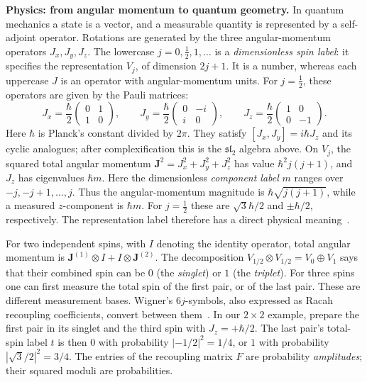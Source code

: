 \begin{physicsbox}
\textbf{Physics: from angular momentum to quantum geometry.}
In quantum mechanics a state is a vector, and a measurable quantity
is represented by a self-adjoint operator. Rotations are generated
by the three angular-momentum operators $J_x,J_y,J_z$.
The lowercase $j=0,\tfrac12,1,\ldots$ is a \emph{dimensionless
spin label}: it specifies the representation $V_j$, of dimension
$2j+1$. It is a number, whereas each uppercase $J$ is an operator
with angular-momentum units. For $j=\tfrac12$, these operators
are given by the Pauli matrices:
\[
 J_x=\frac{\hbar}{2}\begin{pmatrix}0&1\\1&0\end{pmatrix},\qquad
 J_y=\frac{\hbar}{2}\begin{pmatrix}0&-i\\i&0\end{pmatrix},\qquad
 J_z=\frac{\hbar}{2}\begin{pmatrix}1&0\\0&-1\end{pmatrix}.
\]
Here $\hbar$ is Planck's constant divided by $2\pi$.
They satisfy $[J_x,J_y]=i\hbar J_z$ and its cyclic analogues;
after complexification this is the $\mathfrak{sl}_2$ algebra above.
On $V_j$, the squared total angular momentum
$\mathbf J^2=J_x^2+J_y^2+J_z^2$ has value $\hbar^2j(j+1)$,
and $J_z$ has eigenvalues $\hbar m$. Here the dimensionless
\emph{component label} $m$ ranges over $-j,-j+1,\ldots,j$.
Thus the angular-momentum magnitude is $\hbar\sqrt{j(j+1)}$,
while a measured $z$-component is $\hbar m$. For $j=\tfrac12$
these are $\sqrt3\hbar/2$ and $\pm\hbar/2$, respectively.
The representation label therefore has a direct physical meaning~\cite[Section 4.2]{CappellaroSpin}.

For two independent spins, with $I$ denoting the identity operator,
total angular momentum is
$\mathbf J^{(1)}\otimes I+I\otimes\mathbf J^{(2)}$.
The decomposition $V_{1/2}\otimes V_{1/2}=V_0\oplus V_1$
says that their combined spin can be $0$ (the \emph{singlet})
or $1$ (the \emph{triplet}). For three spins one can first measure
the total spin of the first pair, or of the last pair. These are
different measurement bases. Wigner's $6j$-symbols, also expressed
as Racah recoupling coefficients, convert between them~\cite[Section 1]{AquilantiSixJ}.
In our $2\times2$ example, prepare the first pair in its singlet
and the third spin with $J_z=+\hbar/2$. The last pair's total-spin
label $t$ is then $0$ with probability $|-1/2|^2=1/4$, or $1$
with probability $|\sqrt3/2|^2=3/4$.
The entries of the recoupling matrix $F$ are probability
\emph{amplitudes}; their squared moduli are probabilities.


\end{physicsbox}
